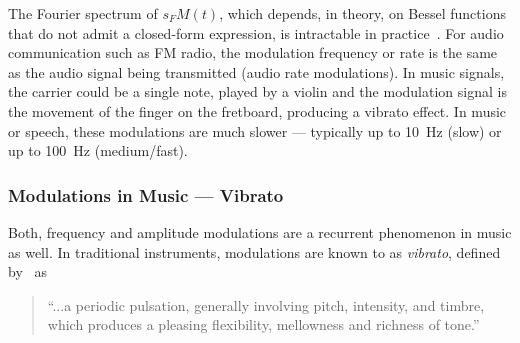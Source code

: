 The Fourier spectrum of $s_FM(t)$, which depends, in theory, on Bessel functions that do not admit a closed-form expression, is intractable in practice~\cite{abramowitz64}.
For audio communication such as FM radio, the modulation frequency or rate is the same as the audio signal being transmitted (audio rate modulations).
In music signals, the carrier could be a single note, played by a violin and the modulation signal is the movement of the finger on the fretboard, producing a vibrato effect.
In music or speech, these modulations are much slower --- typically up to 10~\si{\hertz} (slow) or up to 100~\si{\hertz} (medium/fast).

\subsubsection*{Modulations in Music --- Vibrato}

Both, frequency and amplitude modulations are a recurrent phenomenon in music as well.
In traditional instruments, modulations are known to as \emph{vibrato}, defined by~\cite{seashore31} as

\begin{quote}
``...a periodic pulsation, generally involving pitch, intensity, and timbre, which produces a pleasing flexibility, mellowness and richness of tone.''
\end{quote}

